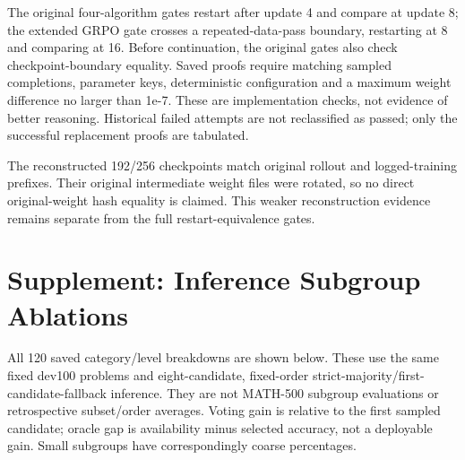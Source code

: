 \documentclass[10pt,letterpaper]{article}
\begin{document}
The original four-algorithm gates restart after update 4 and compare at update 8; the extended GRPO gate crosses a repeated-data-pass boundary, restarting at 8 and comparing at 16. Before continuation, the original gates also check checkpoint-boundary equality. Saved proofs require matching sampled completions, parameter keys, deterministic configuration and a maximum weight difference no larger than 1e-7. These are implementation checks, not evidence of better reasoning. Historical failed attempts are not reclassified as passed; only the successful replacement proofs are tabulated.

The reconstructed 192/256 checkpoints match original rollout and logged-training prefixes. Their original intermediate weight files were rotated, so no direct original-weight hash equality is claimed. This weaker reconstruction evidence remains separate from the full restart-equivalence gates.

\clearpage

\section{Supplement: Inference Subgroup Ablations}

All 120 saved category/level breakdowns are shown below. These use the same fixed dev100 problems and eight-candidate, fixed-order strict-majority/first-candidate-fallback inference. They are not MATH-500 subgroup evaluations or retrospective subset/order averages. Voting gain is relative to the first sampled candidate; oracle gap is availability minus selected accuracy, not a deployable gain. Small subgroups have correspondingly coarse percentages.
\end{document}
